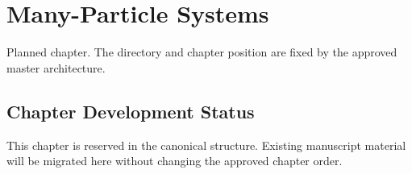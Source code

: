 \chapter{Many-Particle Systems}
\label{chap:23-many-particle-systems}

\begin{roadmapbox}
Planned chapter. The directory and chapter position are fixed by the approved master architecture.
\end{roadmapbox}

\section*{Chapter Development Status}
This chapter is reserved in the canonical structure. Existing manuscript material will be migrated here without changing the approved chapter order.
